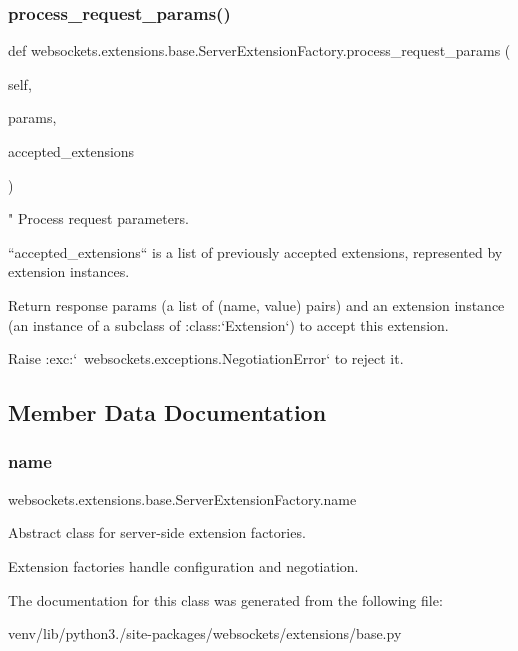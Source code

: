 \subsubsection{\texorpdfstring{process\+\_\+request\+\_\+params()}{process\_request\_params()}}
{\footnotesize\ttfamily def websockets.\+extensions.\+base.\+Server\+Extension\+Factory.\+process\+\_\+request\+\_\+params (\begin{DoxyParamCaption}\item[{}]{self,  }\item[{}]{params,  }\item[{}]{accepted\+\_\+extensions }\end{DoxyParamCaption})}

\begin{DoxyVerb}"
Process request parameters.

``accepted_extensions`` is a list of previously accepted extensions,
represented by extension instances.

Return response params (a list of (name, value) pairs) and an
extension instance (an instance of a subclass of :class:`Extension`)
to accept this extension.

Raise :exc:`~websockets.exceptions.NegotiationError` to reject it.\end{DoxyVerb}
 

\subsection{Member Data Documentation}
\mbox{\label{classwebsockets_1_1extensions_1_1base_1_1_server_extension_factory_af3dc083d02a076fa1250c43b55735ebf}} 
\subsubsection{\texorpdfstring{name}{name}}
{\footnotesize\ttfamily websockets.\+extensions.\+base.\+Server\+Extension\+Factory.\+name\hspace{0.3cm}{\ttfamily [static]}}

\begin{DoxyVerb}Abstract class for server-side extension factories.

Extension factories handle configuration and negotiation.\end{DoxyVerb}
 

The documentation for this class was generated from the following file\+:\begin{DoxyCompactItemize}
\item 
venv/lib/python3./site-\/packages/websockets/extensions/base.\+py\end{DoxyCompactItemize}

